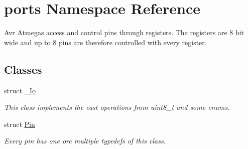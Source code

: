 \hypertarget{namespaceports}{}\section{ports Namespace Reference}
\label{namespaceports}


Avr Atmegas access and control pins through registers. The registers are 8 bit wide and up to 8 pins are therefore controlled with every register.  


\subsection*{Classes}
\begin{DoxyCompactItemize}
\item 
struct \hyperlink{structports_1_1__Io}{\+\_\+\+Io}
\begin{DoxyCompactList}\small\item\em This class implements the cast operations from uint8\+\_\+t and some enums. \end{DoxyCompactList}\item 
struct \hyperlink{structports_1_1Pin}{Pin}
\begin{DoxyCompactList}\small\item\em Every pin has one ore multiple typedefs of this class. \end{DoxyCompactList}\end{DoxyCompactItemize}
